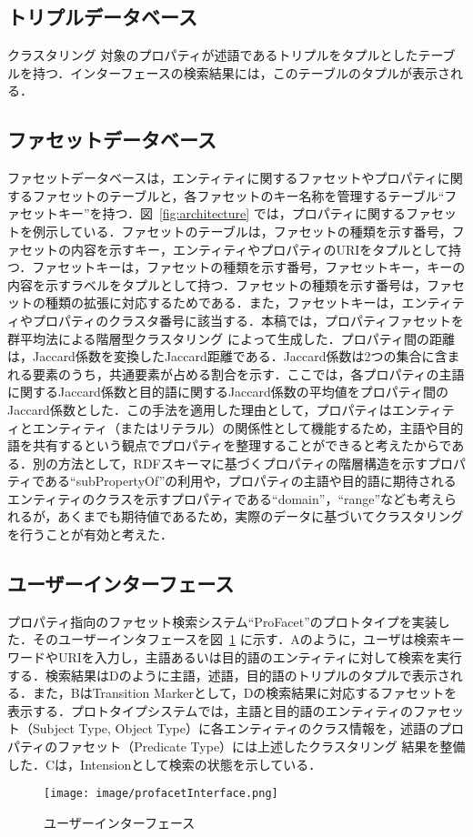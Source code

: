 \subsection{トリプルデータベース}
クラスタリング 対象のプロパティが述語であるトリプルをタプルとしたテーブルを持つ．インターフェースの検索結果には，このテーブルのタプルが表示される．
%
\subsection{ファセットデータベース}
ファセットデータベースは，エンティティに関するファセットやプロパティに関するファセットのテーブルと，各ファセットのキー名称を管理するテーブル``ファセットキー''を持つ．図~\ref{fig:architecture} では，プロパティに関するファセットを例示している．ファセットのテーブルは，ファセットの種類を示す番号，ファセットの内容を示すキー，エンティティやプロパティのURIをタプルとして持つ．ファセットキーは，ファセットの種類を示す番号，ファセットキー，キーの内容を示すラベルをタプルとして持つ．ファセットの種類を示す番号は，ファセットの種類の拡張に対応するためである．また，ファセットキーは，エンティティやプロパティのクラスタ番号に該当する．本稿では，プロパティファセットを群平均法による階層型クラスタリング によって生成した．プロパティ間の距離は，Jaccard係数を変換したJaccard距離である．Jaccard係数は2つの集合に含まれる要素のうち，共通要素が占める割合を示す．ここでは，各プロパティの主語に関するJaccard係数と目的語に関するJaccard係数の平均値をプロパティ間のJaccard係数とした．この手法を適用した理由として，プロパティはエンティティとエンティティ（またはリテラル）の関係性として機能するため，主語や目的語を共有するという観点でプロパティを整理することができると考えたからである．別の方法として，RDFスキーマに基づくプロパティの階層構造を示すプロパティである``subPropertyOf''の利用や，プロパティの主語や目的語に期待されるエンティティのクラスを示すプロパティである``domain''，``range''なども考えられるが，あくまでも期待値であるため，実際のデータに基づいてクラスタリング を行うことが有効と考えた．
%
\subsection{ユーザーインターフェース}
プロパティ指向のファセット検索システム``ProFacet''のプロトタイプを実装した．そのユーザーインタフェースを図~\ref{fig:profacetInterface} に示す．Aのように，ユーザは検索キーワードやURIを入力し，主語あるいは目的語のエンティティに対して検索を実行する．検索結果はDのように主語，述語，目的語のトリプルのタプルで表示される．また，BはTransition Markerとして，Dの検索結果に対応するファセットを表示する．プロトタイプシステムでは，主語と目的語のエンティティのファセット（Subject Type, Object Type）に各エンティティのクラス情報を，述語のプロパティのファセット（Predicate Type）には上述したクラスタリング 結果を整備した．Cは，Intensionとして検索の状態を示している．

\begin{figure}[h]
\centering
\texttt{[image: image/profacetInterface.png]}
\caption{\small
ユーザーインターフェース
}
\label{fig:profacetInterface}
\end{figure}
